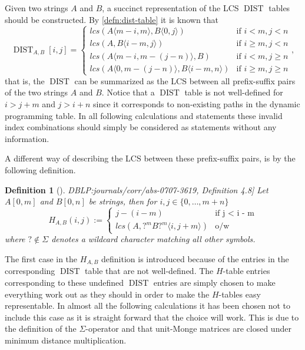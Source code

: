 \documentclass[twoside,11pt,openright]{report}
\newcommand{\DIST}{\operatorname{DIST}}
\newcommand{\substr}[3]{#1\langle #2, #3 \rangle}
\newcommand{\str}[3]{#1[#2, #3]}
\newcommand{\refbook}[2]{\cite[#1]{DBLP:journals/corr/abs-0707-3619}, #2}
\newtheorem{mydef}{Definition}
\begin{document}
Given two strings $A$ and $B$, a succinct representation of the LCS $\DIST$ tables should be constructed. By \cref{defn:dist-table} it is known that
\[
  \DIST_{A,B}[i, j] = \left\{
    \begin{array}{ll}
      lcs(\substr{A}{m - i}{m}, \substr{B}{0}{j})             & \text{if } i < m, j < n \\
      lcs(A, \substr{B}{i - m}{j})                            & \text{if } i \geq m, j < n \\
      lcs(\substr{A}{m - i}{m - (j - n)}, B)                  & \text{if } i < m, j \geq n \\
      lcs(\substr{A}{0}{m - (j - n)}, \substr{B}{i - m}{n})   & \text{if } i \geq m, j \geq n
    \end{array}
  \right. ,
\]
that is, the $\DIST$ can be summarized as the LCS between all prefix-suffix pairs of the two strings $A$ and $B$.
Notice that a $\DIST$ table is not well-defined for $i > j + m$ and $j > i + n$ since it corresponds to non-existing paths in the dynamic programming table. In all following calculations and statements these invalid index combinations should simply be considered as statements without any information.

A different way of describing the LCS between these prefix-suffix pairs, is by the following definition.

\begin{mydef}[\refbook{p.-48}{Definition 4.8}]
  \label{def:H-table}
  Let $\str{A}{0}{m}$ and $\str{B}{0}{n}$ be strings, then for $i, j \in \{ 0, \dots, m + n \}$
  \[
    H_{A,B}(i, j) := \begin{cases}
                        j - (i - m)                         & \text{if j < i - m} \\
                        lcs(A, \substr{?^mB?^m}{i}{j + m})  & \text{o/w}
                      \end{cases}
  \]
  where $? \not\in \Sigma$ denotes a wildcard character matching all other symbols.
\end{mydef}
The first case in the $H_{A,B}$ definition is introduced because of the entries in the corresponding $\DIST$ table that are not well-defined. The $H$-table entries corresponding to these undefined $\DIST$ entries are simply chosen to make everything work out as they should in order to make the $H$-tables easy representable. In almost all the following calculations it has been chosen not to include this case as it is straight forward that the choice will work. This is due to the definition of the $\Sigma$-operator and that unit-Monge matrices are closed under minimum distance multiplication.
\end{document}
